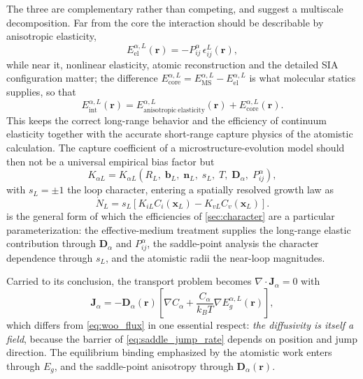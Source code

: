 \documentclass{article}
\newcommand{\bvec}{\bm b}
\newcommand{\nvec}{\bm n}
\newcommand{\Dten}{\bm D}
\begin{document}
The three are complementary rather than competing, and suggest a multiscale
decomposition. Far from the core the interaction should be describable by
anisotropic elasticity,
\begin{equation}
    E_{\mathrm{el}}^{\alpha,L}(\bm r)=-P_{ij}^{\alpha}\,\epsilon_{ij}^{L}(\bm r),
    \label{eq:long_range}
\end{equation}
while near it, nonlinear elasticity, atomic reconstruction and the detailed SIA
configuration matter; the difference $E^{\alpha,L}_{\mathrm{core}}
=E^{\alpha,L}_{\mathrm{MS}}-E^{\alpha,L}_{\mathrm{el}}$ is what molecular statics
supplies, so that
\begin{equation}
\boxed{
E_{\mathrm{int}}^{\alpha,L}(\bm r)
=E_{\mathrm{anisotropic\ elasticity}}^{\alpha,L}(\bm r)
+E_{\mathrm{core}}^{\alpha,L}(\bm r).}
\label{eq:hybrid_energy}
\end{equation}
This keeps the correct long-range behavior and the efficiency of continuum
elasticity together with the accurate short-range capture physics of the
atomistic calculation. The capture coefficient of a microstructure-evolution
model should then not be a universal empirical bias factor but
\begin{equation}
    K_{\alpha L}
    =K_{\alpha L}\!\left(
       R_L,\;\bvec_L,\;\nvec_L,\;s_L,\;T,\;\Dten_{\alpha},\;P_{ij}^{\alpha}
    \right),
    \label{eq:general_capture_kernel}
\end{equation}
with $s_L=\pm1$ the loop character, entering a spatially resolved growth law as
\begin{equation}
    \dot N_L=s_L\left[K_{iL}C_i(\bm x_L)-K_{vL}C_v(\bm x_L)\right].
    \label{eq:loop_growth_general}
\end{equation}
 is the general form of which the efficiencies of
\cref{sec:character} are a particular parameterization: the effective-medium
treatment supplies the long-range elastic contribution through $\Dten_\alpha$ and
$P^\alpha_{ij}$, the saddle-point analysis the character dependence through
$s_L$, and the atomistic radii the near-loop magnitudes.

Carried to its conclusion, the transport problem becomes
$\nabla\!\cdot\!\bm J_\alpha=0$ with
\begin{equation}
    \bm J_\alpha
    =-\Dten_\alpha(\bm r)
    \left[\nabla C_\alpha
    +\frac{C_\alpha}{k_BT}\nabla E_g^{\alpha,L}(\bm r)\right],
    \label{eq:unified_flux}
\end{equation}
which differs from \cref{eq:woo_flux} in one essential respect: \emph{the
diffusivity is itself a field}, because the barrier of
\cref{eq:saddle_jump_rate} depends on position and jump direction. The
equilibrium binding emphasized by the atomistic work enters through $E_g$, and
the saddle-point anisotropy through $\Dten_\alpha(\bm r)$.
\end{document}

